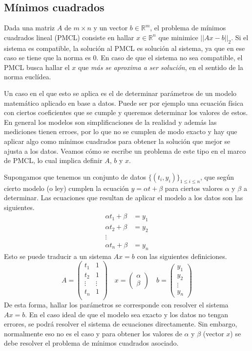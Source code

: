 \documentclass[a4paper, 12pt]{report}
\newcommand{\R}{\mathbb{R}}
\theoremstyle{definition}
\begin{document}
\subsection{Mínimos cuadrados}\label{sec-minCuad}

Dada una matriz $A$ de $m\times n$ y un vector $b\in \R^m$, el problema de mínimos cuadrados lineal (PMCL) consiste en hallar $x\in\R^n$ que minimice $||Ax-b||_2$. Si el sistema es compatible, la solución al PMCL es solución al sistema, ya que en ese caso se tiene que la norma es $0$. En caso de que el sistema no sea compatible, el PMCL busca hallar el $x$ que {\sl más se aproxima a ser solución}, en el sentido de la norma euclídea.

Un caso en el que esto se aplica es el de determinar parámetros de un modelo matemático aplicado en base a datos. Puede ser por ejemplo una ecuación física con ciertos coeficientes que se cumple y queremos determinar los valores de estos. En general los modelos son simplificaciones de la realidad y además las mediciones tienen erroes, por lo que no se cumplen de modo exacto y hay que aplicar algo como mínimos cuadrados para obtener la solución que mejor se ajusta a los datos. Veamos cómo se escribe un problema de este tipo en el marco de PMCL, lo cual implica definir $A$, $b$ y $x$.

Supongamos que tenemos un conjunto de datos $\{(t_i,y_i)\}_{1\leq i\leq n}$, que según cierto modelo (o ley) cumplen la ecuación $y=\alpha t + \beta$ para ciertos valores $\alpha$ y $\beta$ a determinar. Las ecuaciones que resultan de aplicar el modelo a los datos son las siguientes.
\begin{align*}
	\alpha t_1 + \beta &= y_1\\
	\alpha t_2 + \beta &= y_2\\
	\vdots \\
	\alpha t_n + \beta &= y_n
\end{align*}
Esto se puede traducir a un sistema $Ax=b$ con las siguientes definiciones.
$$A=
\begin{pmatrix}
	 t_1 & 1\\
	 t_2 & 1\\
	 \vdots &\vdots\\
	 t_n & 1 \\
\end{pmatrix}
\quad
x=
\begin{pmatrix}
	\alpha\\
	\beta
\end{pmatrix}
\quad
b=
\begin{pmatrix}
	y_1\\
	y_2\\
	\vdots\\
	y_n
\end{pmatrix}
$$
De esta forma, hallar los parámetros se corresponde con resolver el sistema $Ax=b$. En el caso ideal de que el modelo sea exacto y los datos no tengan errores, se podrá resolver el sistema de ecuaciones directamente. Sin embargo, normalmente eso no es el caso y para obtener los valores de $\alpha$ y $\beta$ (vector $x$) se debe resolver el problema de mínimos cuadrados asociado.
\end{document}
